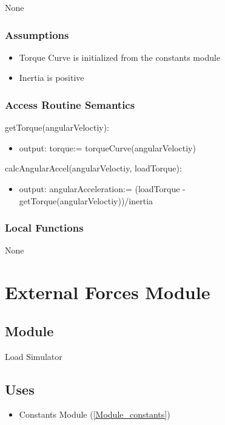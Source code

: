 \documentclass[12pt, titlepage]{article}
\begin{document}
None

\subsubsection{Assumptions}
\begin{itemize}
  \item Torque Curve is initialized from the constants module
  \item Inertia is positive
\end{itemize}

\subsubsection{Access Routine Semantics}

\noindent getTorque(angularVeloctiy):
\begin{itemize}
\item output: torque:= torqueCurve(angularVeloctiy) 
\end{itemize}

\noindent calcAngularAccel(angularVeloctiy, loadTorque):
\begin{itemize}
\item output: angularAcceleration:= (loadTorque - getTorque(angularVeloctiy))/inertia
\end{itemize}

\subsubsection{Local Functions}

None

\newpage

\section{External Forces Module} \label{Module_external_forces} 

\subsection{Module}

Load Simulator

\subsection{Uses}

\begin{itemize}
  \item Constants Module (\ref{Module_constants})
\end{itemize}
\end{document}
